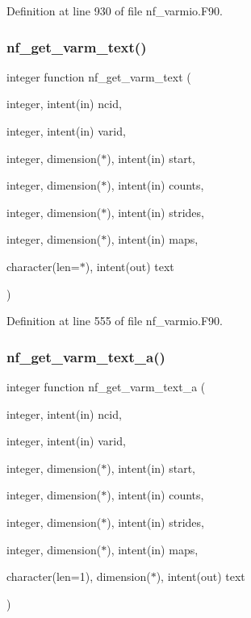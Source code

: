 Definition at line 930 of file nf\+\_\+varmio.\+F90.

\mbox{\label{nf__varmio_8F90_a5083d4646b088bf9ba893c056694a856}} 
\subsubsection{\texorpdfstring{nf\+\_\+get\+\_\+varm\+\_\+text()}{nf\_get\_varm\_text()}}
{\footnotesize\ttfamily integer function nf\+\_\+get\+\_\+varm\+\_\+text (\begin{DoxyParamCaption}\item[{integer, intent(in)}]{ncid,  }\item[{integer, intent(in)}]{varid,  }\item[{integer, dimension($\ast$), intent(in)}]{start,  }\item[{integer, dimension($\ast$), intent(in)}]{counts,  }\item[{integer, dimension($\ast$), intent(in)}]{strides,  }\item[{integer, dimension($\ast$), intent(in)}]{maps,  }\item[{character(len=$\ast$), intent(out)}]{text }\end{DoxyParamCaption})}



Definition at line 555 of file nf\+\_\+varmio.\+F90.

\mbox{\label{nf__varmio_8F90_a932770113cb6f1b7071fa39a55140af3}} 
\subsubsection{\texorpdfstring{nf\+\_\+get\+\_\+varm\+\_\+text\+\_\+a()}{nf\_get\_varm\_text\_a()}}
{\footnotesize\ttfamily integer function nf\+\_\+get\+\_\+varm\+\_\+text\+\_\+a (\begin{DoxyParamCaption}\item[{integer, intent(in)}]{ncid,  }\item[{integer, intent(in)}]{varid,  }\item[{integer, dimension($\ast$), intent(in)}]{start,  }\item[{integer, dimension($\ast$), intent(in)}]{counts,  }\item[{integer, dimension($\ast$), intent(in)}]{strides,  }\item[{integer, dimension($\ast$), intent(in)}]{maps,  }\item[{character(len=1), dimension($\ast$), intent(out)}]{text }\end{DoxyParamCaption})}



